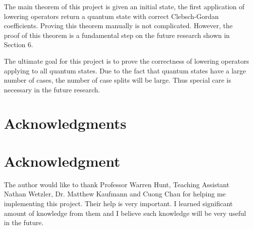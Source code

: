 \documentclass[12pt,journal,compsoc]{IEEEtran}
\begin{document}
The main theorem of this project is given an initial state, the first application of lowering operators return a quantum state with correct Clebsch-Gordan coefficients. Proving this theorem manually is not complicated. However, the proof of this theorem is a fundamental step on the future research shown in Section 6.

The ultimate goal for this project is to prove the correctness of lowering operators applying to all quantum states. Due to the fact that quantum states have a large number of cases, the number of case splits will be large. Thus special care is necessary in the future research. 

\ifCLASSOPTIONcompsoc
  \section*{Acknowledgments}
\else
  \section*{Acknowledgment}
\fi


The author would like to thank Professor Warren Hunt, Teaching Assistant Nathan Wetzler, Dr. Matthew Kaufmann and Cuong Chau for helping me implementing this project. Their help is very important. I learned significant amount of knowledge from them and I believe such knowledge will be very useful in the future.


\ifCLASSOPTIONcaptionsoff
  \newpage
\fi







%

\end{document}
